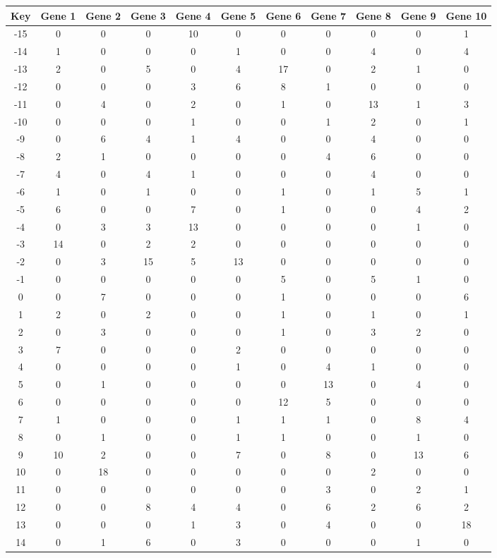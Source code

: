 \begin{tabular}{|c|c|c|c|c|c|c|c|c|c|c|}
\hline
Key & Gene 1 & Gene 2 & Gene 3 & Gene 4 & Gene 5 & Gene 6 & Gene 7 & Gene 8 & Gene 9 & Gene 10 \\
\hline
-15 & 0 & 0 & 0 & 10 & 0 & 0 & 0 & 0 & 0 & 1 \\
-14 & 1 & 0 & 0 & 0 & 1 & 0 & 0 & 4 & 0 & 4 \\
-13 & 2 & 0 & 5 & 0 & 4 & 17 & 0 & 2 & 1 & 0 \\
-12 & 0 & 0 & 0 & 3 & 6 & 8 & 1 & 0 & 0 & 0 \\
-11 & 0 & 4 & 0 & 2 & 0 & 1 & 0 & 13 & 1 & 3 \\
-10 & 0 & 0 & 0 & 1 & 0 & 0 & 1 & 2 & 0 & 1 \\
-9 & 0 & 6 & 4 & 1 & 4 & 0 & 0 & 4 & 0 & 0 \\
-8 & 2 & 1 & 0 & 0 & 0 & 0 & 4 & 6 & 0 & 0 \\
-7 & 4 & 0 & 4 & 1 & 0 & 0 & 0 & 4 & 0 & 0 \\
-6 & 1 & 0 & 1 & 0 & 0 & 1 & 0 & 1 & 5 & 1 \\
-5 & 6 & 0 & 0 & 7 & 0 & 1 & 0 & 0 & 4 & 2 \\
-4 & 0 & 3 & 3 & 13 & 0 & 0 & 0 & 0 & 1 & 0 \\
-3 & 14 & 0 & 2 & 2 & 0 & 0 & 0 & 0 & 0 & 0 \\
-2 & 0 & 3 & 15 & 5 & 13 & 0 & 0 & 0 & 0 & 0 \\
-1 & 0 & 0 & 0 & 0 & 0 & 5 & 0 & 5 & 1 & 0 \\
0 & 0 & 7 & 0 & 0 & 0 & 1 & 0 & 0 & 0 & 6 \\
1 & 2 & 0 & 2 & 0 & 0 & 1 & 0 & 1 & 0 & 1 \\
2 & 0 & 3 & 0 & 0 & 0 & 1 & 0 & 3 & 2 & 0 \\
3 & 7 & 0 & 0 & 0 & 2 & 0 & 0 & 0 & 0 & 0 \\
4 & 0 & 0 & 0 & 0 & 1 & 0 & 4 & 1 & 0 & 0 \\
5 & 0 & 1 & 0 & 0 & 0 & 0 & 13 & 0 & 4 & 0 \\
6 & 0 & 0 & 0 & 0 & 0 & 12 & 5 & 0 & 0 & 0 \\
7 & 1 & 0 & 0 & 0 & 1 & 1 & 1 & 0 & 8 & 4 \\
8 & 0 & 1 & 0 & 0 & 1 & 1 & 0 & 0 & 1 & 0 \\
9 & 10 & 2 & 0 & 0 & 7 & 0 & 8 & 0 & 13 & 6 \\
10 & 0 & 18 & 0 & 0 & 0 & 0 & 0 & 2 & 0 & 0 \\
11 & 0 & 0 & 0 & 0 & 0 & 0 & 3 & 0 & 2 & 1 \\
12 & 0 & 0 & 8 & 4 & 4 & 0 & 6 & 2 & 6 & 2 \\
13 & 0 & 0 & 0 & 1 & 3 & 0 & 4 & 0 & 0 & 18 \\
14 & 0 & 1 & 6 & 0 & 3 & 0 & 0 & 0 & 1 & 0 \\
\hline
\end{tabular}
